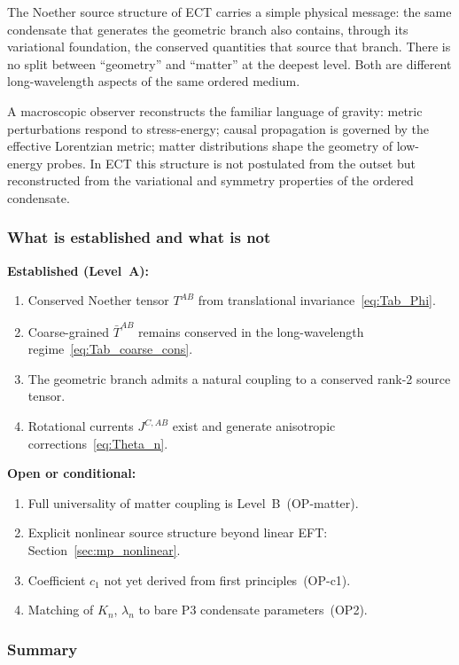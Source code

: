 \documentclass[11pt,a4paper]{article}
\numberwithin{equation}{section}
\begin{document}
The Noether source structure of ECT carries a simple physical message:
the same condensate that generates the geometric branch also contains,
through its variational foundation, the conserved quantities that source
that branch.
There is no split between ``geometry'' and ``matter'' at the deepest
level.
Both are different long-wavelength aspects of the same ordered medium.

A macroscopic observer reconstructs the familiar language of gravity:
metric perturbations respond to stress-energy; causal propagation is
governed by the effective Lorentzian metric; matter distributions shape
the geometry of low-energy probes.
In ECT this structure is not postulated from the outset but
reconstructed from the variational and symmetry properties of the
ordered condensate.

\subsubsection*{What is established and what is not}

\textbf{Established (Level~A):}
\begin{enumerate}[label=(\roman*)]
  \item Conserved Noether tensor $T^{AB}$ from translational
    invariance~\eqref{eq:Tab_Phi}.
  \item Coarse-grained $\bar{T}^{AB}$ remains conserved in the
    long-wavelength regime~\eqref{eq:Tab_coarse_cons}.
  \item The geometric branch admits a natural coupling to a
    conserved rank-2 source tensor.
  \item Rotational currents $J^{C,AB}$ exist and generate
    anisotropic corrections~\eqref{eq:Theta_n}.
\end{enumerate}

\textbf{Open or conditional:}
\begin{enumerate}[label=(\roman*)]
  \item Full universality of matter coupling is Level~B~(OP-matter).
  \item Explicit nonlinear source structure beyond linear EFT:
    Section~\ref{sec:mp_nonlinear}.
  \item Coefficient $c_1$ not yet derived from first principles~(OP-c1).
  \item Matching of $K_n$, $\lambda_n$ to bare P3 condensate
    parameters~(OP2).
\end{enumerate}

\subsubsection*{Summary}
\end{document}
